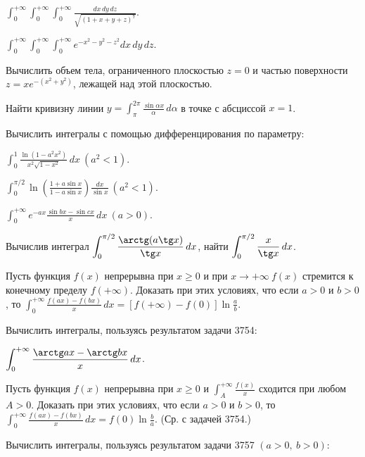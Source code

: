 \documentclass[a5paper,10pt]{article}
\begin{document}
\medskip
{} $\displaystyle\int_0^{+\infty}\int_0^{+\infty}\int_0^{+\infty}
\frac{dx\,dy\,dz}{\sqrt{(1+x+y+z)^7}}$.

\medskip
{} $\displaystyle\int_0^{+\infty}\int_0^{+\infty}\int_0^{+\infty}
e^{-x^2-y^2-z^2}dx\,dy\,dz$.

\medskip
{} Вычислить объем тела, ограниченного плоскостью $z=0$ и частью поверхности $z=xe^{-(x^2+y^2)}$, лежащей над этой плоскостью.

\medskip
{} Найти кривизну линии $\displaystyle y=\int_{\pi}^{2\pi}\frac{\sin\alpha x}{\alpha}\,d\alpha$
в точке с абсциссой $x=1$.

\medskip
\noindent Вычислить интегралы с помощью дифференцирования по параметру:

\medskip
{} $\displaystyle \int_0^1\frac{\ln(1-a^2x^2)}{x^2\sqrt{1-x^2}}\,dx\ (a^2<1)$.

\medskip
{} $\displaystyle \int_0^{\pi/2}\ln\left(\frac{1+a\sin x}{1-a\sin x}\right)\frac{dx}{\sin x}\ (a^2<1)$.

\medskip
{} $\displaystyle \int_0^{+\infty}e^{-ax}\frac{\sin bx-\sin cx}{x}\,dx\ (a>0)$.

\medskip
{} Вычислив интеграл $\displaystyle\int_0^{\pi/2}\frac{\arctg(a\tg x)}{\tg x}\,dx$,
найти $\displaystyle\int_0^{\pi/2}\frac{x}{\tg x}\,dx$.

\medskip
{} Пусть функция $f(x)$ непрерывна при $x\ge0$ и при $x\to+\infty\ f(x)$
стремится к конечному пределу $f(+\infty)$. Доказать при этих условиях, что если
$a>0$ и $b>0$, то $\displaystyle\int_0^{+\infty}\frac{f(ax)-f(bx)}{x}\,dx=[f(+\infty)-f(0)]\ln\frac ab$.

\medskip
\noindent Вычислить интегралы, пользуясь результатом задачи 3754:

\medskip
{} $\displaystyle\int_0^{+\infty}\frac{\arctg ax-\arctg bx}{x}\,dx$.

\medskip
{} Пусть функция $f(x)$ непрерывна при $x\ge0$ и
$\displaystyle \int_A^{+\infty}\frac{f(x)}{x}$
сходится при любом $A>0$. Доказать при этих условиях, что если $a>0$ и $b>0$, то\\
$\displaystyle \int_0^{+\infty}\frac{f(ax)-f(bx)}{x}\,dx=f(0)\ln\frac ba.$ (Ср. с задачей 3754.)

\medskip
\noindent Вычислить интегралы, пользуясь результатом задачи 3757 $(a>0,\ b>0)$:
\end{document}
